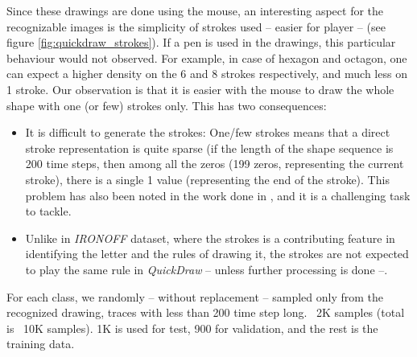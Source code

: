 \par Since these drawings are done using the mouse, an interesting aspect for the recognizable images is the simplicity of strokes used -- easier for player -- (see figure \ref{fig:quickdraw_strokes}). If a pen is used in the drawings, this particular behaviour would not observed. For example, in case of hexagon and octagon, one can expect a higher density on the 6 and 8 strokes respectively, and much less on 1 stroke. Our observation is that it is easier with the mouse to draw the whole shape with one (or few) strokes only. This has two consequences:
\begin{itemize}[noitemsep]
    \item It is difficult to generate the strokes: One/few strokes means that a direct stroke representation is quite sparse (if the length of the shape sequence is 200 time steps, then among all the zeros (199 zeros, representing the current stroke), there is a single 1 value (representing the end of the stroke). This problem has also been noted in the work done in \citep{ha2017neural}, and it is a challenging task to tackle.
    \item Unlike in \textit{IRONOFF} dataset, where the strokes is a contributing feature in identifying the letter and the rules of drawing it, the strokes are not expected to play the same rule in \textit{QuickDraw} -- unless further processing is done --.
\end{itemize}

\par For each class, we randomly -- without replacement -- sampled only from the recognized drawing, traces with less than 200 time step long. ~2K samples (total is ~10K samples). 1K is used for test, 900 for validation, and the rest is the training data.


